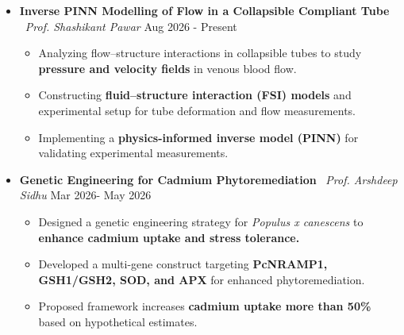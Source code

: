 \documentclass[letterpaper,9pt]{article}
\begin{document}
\begin{itemize}[leftmargin=0pt, parsep=0pt, itemsep=0.4em]
\begin{itemize}[leftmargin=0pt, parsep=0pt, itemsep=0.8em]
\item[] \textbf{Inverse PINN Modelling of Flow in a Collapsible Compliant Tube} \textbar\ \textit{Prof. Shashikant Pawar} \hfill Aug 2026 - Present
{\small
\begin{itemize}[leftmargin=1em, label=\textbullet, itemsep=0.2pt, parsep=0pt, topsep=1pt]
    \item Analyzing flow--structure interactions in collapsible tubes to study \textbf{pressure and velocity fields} in venous blood flow.
    \item Constructing \textbf{fluid--structure interaction (FSI) models} and experimental setup for tube deformation and flow measurements.
    \item Implementing a \textbf{physics-informed inverse model (PINN)} for validating experimental measurements.
\end{itemize}
}

\item[] \textbf{Genetic Engineering for Cadmium Phytoremediation} \textbar\ \textit{Prof. Arshdeep Sidhu} \hfill Mar 2026- May 2026
{\small
\begin{itemize}[leftmargin=1em, label=\textbullet, itemsep=0.2pt, parsep=0pt, topsep=1pt]
    \item Designed a genetic engineering strategy for \textit{Populus x canescens} to \textbf{enhance cadmium uptake and stress tolerance.}
    \item Developed a multi-gene construct targeting \textbf{PcNRAMP1, GSH1/GSH2, SOD, and APX} for enhanced phytoremediation.
    \item Proposed framework increases \textbf{cadmium uptake more than 50\%} based on hypothetical estimates. 
\end{itemize}
}



\end{itemize}
\end{itemize}
\end{document}
